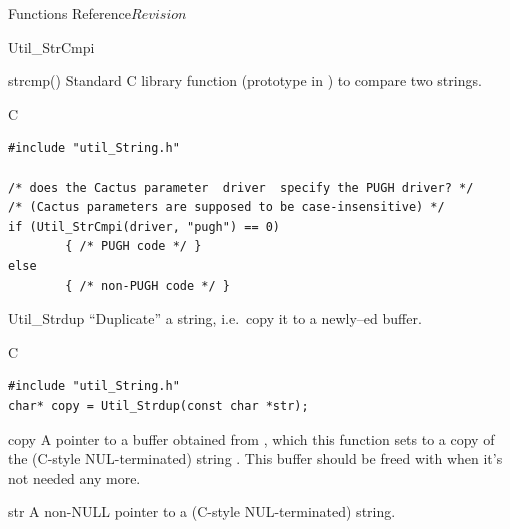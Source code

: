 \begin{cactuspart}{ Functions Reference}{}{$Revision$}
\begin{FunctionDescription}{Util\_StrCmpi}
\begin{SeeAlsoSection}
\begin{SeeAlso}{strcmp()}
Standard C library function (prototype in )
to compare two strings.
\end{SeeAlso}
\end{SeeAlsoSection}

\begin{ExampleSection}
\begin{Example}{C}
\begin{verbatim}
#include "util_String.h"

/* does the Cactus parameter  driver  specify the PUGH driver? */
/* (Cactus parameters are supposed to be case-insensitive) */
if (Util_StrCmpi(driver, "pugh") == 0)
        { /* PUGH code */ }
else
        { /* non-PUGH code */ }
\end{verbatim}
\end{Example}
\end{ExampleSection}
\end{FunctionDescription}


\begin{FunctionDescription}{Util\_Strdup}
\label{Util-Strdup}
``Duplicate'' a string, i.e.\ copy it to a newly--ed buffer.

\begin{SynopsisSection}
\begin{Synopsis}{C}
\begin{verbatim}
#include "util_String.h"
char* copy = Util_Strdup(const char *str);
\end{verbatim}
\end{Synopsis}
\end{SynopsisSection}

\begin{ResultSection}
\begin{Result}{copy}
A pointer to a buffer obtained from ,
which this function sets to a copy of the (C-style NUL-terminated)
string .  This buffer should be freed with 
when it's not needed any more.
\end{Result}
\end{ResultSection}

\begin{ParameterSection}
\begin{Parameter}{str}
A non-NULL pointer to a (C-style NUL-terminated) string.
\end{Parameter}
\end{ParameterSection}


\end{FunctionDescription}
\end{cactuspart}
